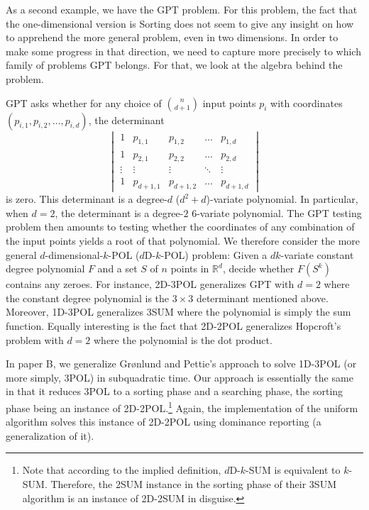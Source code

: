 As a second example, we have the GPT problem. For this problem, the fact that
the one-dimensional version is Sorting does not seem to give any insight on how
to apprehend the more general problem, even in two dimensions. In order to make
some progress in that direction, we need to capture more precisely to which
family of problems GPT belongs. For that, we look at the algebra behind the
problem.

GPT asks whether for any choice of \(n \choose d+1\) input points \(p_i\) with
coordinates \((p_{i,1} , p_{i,2} , \ldots, p_{i,d} )\),
the determinant
%
\begin{displaymath}
  \begin{vmatrix}
    1 & p_{1,1} & p_{1,2} & \hdots & p_{1,d} \\
    1 & p_{2,1} & p_{2,2} & \hdots & p_{2,d} \\
    \vdots & \vdots & \vdots & \ddots & \vdots \\
    1 & p_{d+1,1} & p_{d+1,2} & \hdots & p_{d+1,d}
  \end{vmatrix}
\end{displaymath}
is zero. This determinant is a degree-\(d\) (\(d^2 + d\))-variate polynomial.
In particular, when \(d=2\), the determinant is a degree-\(2\) \(6\)-variate
polynomial. The GPT testing problem then amounts to testing whether the
coordinates of any combination of the input points yields a root of that
polynomial. We therefore consider the more general \(d\)-dimensional-\(k\)-POL
(\(d\)D-\(k\)-POL) problem:
%
Given a \(dk\)-variate constant degree polynomial \(F\) and a set \(S\) of \(n\) points
in \(\mathbb{R}^d\), decide whether \(F(S^k)\) contains any zeroes.
%
For instance, 2D-3POL generalizes GPT with \(d=2\) where the constant degree
polynomial is the \(3 \times 3\) determinant mentioned above. Moreover, 1D-3POL
generalizes 3SUM where the polynomial is simply the sum function. Equally
interesting is the fact that 2D-2POL generalizes Hopcroft's problem with
\(d=2\) where the polynomial is the dot product.

In paper B, we generalize Gr\o nlund and Pettie's approach to solve 1D-3POL (or
more simply, 3POL) in subquadratic time. Our approach is essentially the same
in that it reduces 3POL to a sorting phase and a searching phase, the sorting
phase being an instance of 2D-2POL.\footnote{Note that according to the implied
definition, \(d\)D-\(k\)-SUM is equivalent to \(k\)-SUM. Therefore, the 2SUM
instance in the sorting phase of their 3SUM algorithm is an instance of 2D-2SUM
in disguise.} Again, the implementation of the uniform algorithm solves this
instance of 2D-2POL using dominance reporting (a generalization of it).

